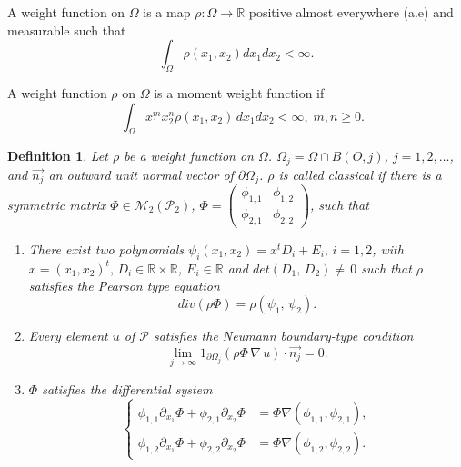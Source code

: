 \documentclass[11pt]{article}
\newtheorem{definition}[theorem]{Definition}
\begin{document}
	{ A weight function on $\Omega$ is a map $\rho:\Omega\rightarrow\mathbb{R}$  positive almost everywhere (a.e) and measurable such that  $$\int_{{\Omega}}\rho(x_1,x_2)dx_1dx_2<\infty.$$
		
			A  weight function $\rho$ on  $\Omega$ is a moment weight function if 
			\begin{equation}
				\quad \int_\Omega x_1^m x_2^n \rho(x_1,x_2)\,dx_1dx_2 < \infty,\; m,n\geq 0.
			\end{equation}
	}
	\begin{definition}\cite{NJN} \label{CWF}	Let  $\rho$ be a weight function on  $\Omega$.  $\Omega_j = \Omega \cap B(O,j)$, $j = 1,2, \dots$, and $\overrightarrow{n_j}$ an outward unit normal vector of $\partial \Omega_j$. $\rho$  is called classical if there is a symmetric matrix $\varPhi\in\mathcal{M}_{2}\left(\mathcal{P}_2\right)$, 	
		$\varPhi=\left(\begin{matrix}
			\phi_{1,1}&\phi_{1,2}\\
			\phi_{2,1}&\phi_{2,2}
		\end{matrix}\right)$, such that
		\begin{enumerate}
			\item {There exist two polynomials $\psi_i(x_1,x_2)=x^tD_i+E_i,\,i=1,2$, with $x=(x_1,x_2)^t,\,D_i\in\mathbb{R}\times\mathbb{R}$, $E_i\in \mathbb{R}$ and $det\left(D_1,\,D_2\right)\neq\,0$ such that $\rho$ satisfies the Pearson type equation
				\begin{equation}\label{te2a}
					div(\rho\varPhi)=\rho\left(\psi_{1},\,\psi_{2}\right).
			\end{equation} }
			\item Every element $u$ of $\mathcal{P}$ satisfies the Neumann boundary-type  condition   
			\begin{equation}\label{bc}
				\lim\limits_{j\rightarrow\infty}1_{\partial\Omega_j}\left(\rho \Phi\,\nabla\,u\right)\cdot\overrightarrow{n_j}=0.
			\end{equation}
			\item $\Phi$ satisfies the differential system 
		\begin{equation}\label{te1}
				\left\{\begin{array}{ccc}
\phi_{1,1}\partial_{x_1}\Phi+\phi_{2,1}\partial_{x_2}\Phi&=\Phi\nabla\left(\phi_{1,1},\phi_{2,1}\right),\\
    \phi_{1,2}\partial_{x_1}\Phi+\phi_{2,2}\partial_{x_2}\Phi&=\Phi\nabla\left(\phi_{1,2},\phi_{2,2}\right).
			\end{array}\right.
			\end{equation}
		\end{enumerate} 
	\end{definition}
	
\end{document}
